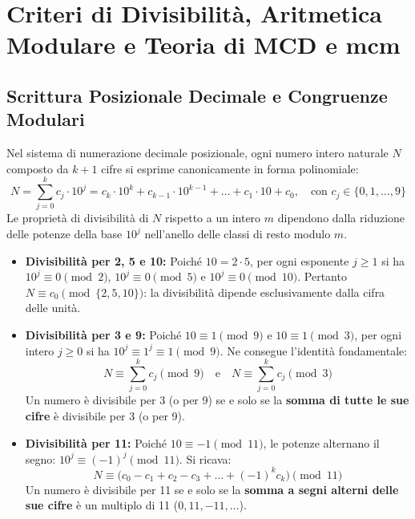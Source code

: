 \documentclass[11pt,a4paper,oneside]{report}
\begin{document}
\chapter{Criteri di Divisibilit\`a, Aritmetica Modulare e Teoria di MCD e mcm}

\section{Scrittura Posizionale Decimale e Congruenze Modulari}
Nel sistema di numerazione decimale posizionale, ogni numero intero naturale $N$ composto da $k+1$ cifre si esprime canonicamente in forma polinomiale:
\[
N = \sum_{j=0}^k c_j \cdot 10^j = c_k \cdot 10^k + c_{k-1} \cdot 10^{k-1} + \dots + c_1 \cdot 10 + c_0, \quad \text{con } c_j \in \{0, 1, \dots, 9\}
\]
Le propriet\`a di divisibilit\`a di $N$ rispetto a un intero $m$ dipendono dalla riduzione delle potenze della base $10^j$ nell'anello delle classi di resto modulo $m$.
\begin{itemize}[leftmargin=2em]
  \item \textbf{Divisibilit\`a per 2, 5 e 10:} Poich\'e $10 = 2 \cdot 5$, per ogni esponente $j \ge 1$ si ha $10^j \equiv 0 \pmod 2$, $10^j \equiv 0 \pmod 5$ e $10^j \equiv 0 \pmod{10}$. Pertanto $N \equiv c_0 \pmod{\{2, 5, 10\}}$: la divisibilit\`a dipende esclusivamente dalla cifra delle unit\`a.
  \item \textbf{Divisibilit\`a per 3 e 9:} Poich\'e $10 \equiv 1 \pmod 9$ e $10 \equiv 1 \pmod 3$, per ogni intero $j \ge 0$ si ha $10^j \equiv 1^j \equiv 1 \pmod 9$. Ne consegue l'identit\`a fondamentale:
  \[
  N \equiv \sum_{j=0}^k c_j \pmod 9 \quad \text{e} \quad N \equiv \sum_{j=0}^k c_j \pmod 3
  \]
  Un numero \`e divisibile per 3 (o per 9) se e solo se la \textbf{somma di tutte le sue cifre} \`e divisibile per 3 (o per 9).
  \item \textbf{Divisibilit\`a per 11:} Poich\'e $10 \equiv -1 \pmod{11}$, le potenze alternano il segno: $10^j \equiv (-1)^j \pmod{11}$. Si ricava:
  \[
  N \equiv \big( c_0 - c_1 + c_2 - c_3 + \dots + (-1)^k c_k \big) \pmod{11}
  \]
  Un numero \`e divisibile per 11 se e solo se la \textbf{somma a segni alterni delle sue cifre} \`e un multiplo di 11 ($0, 11, -11, \dots$).
\end{itemize}
\end{document}
